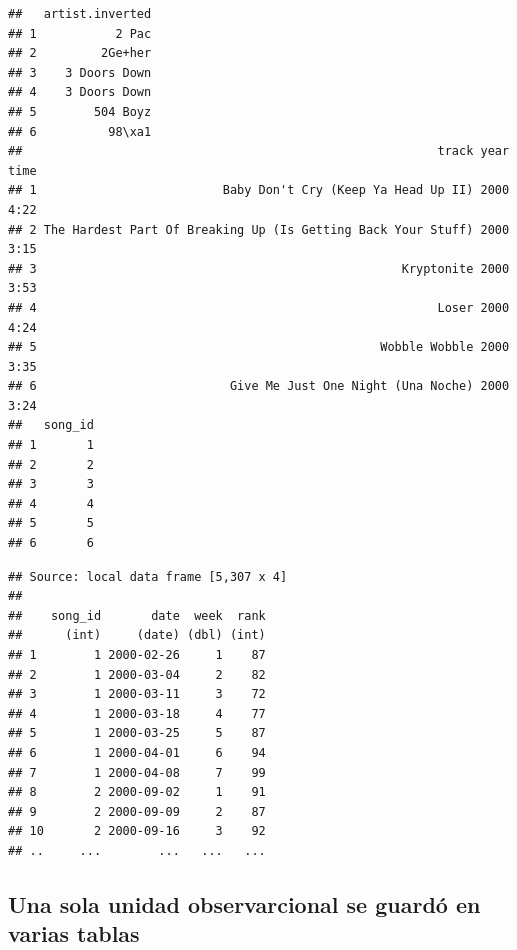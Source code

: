 \documentclass[]{article}
\newenvironment{Shaded}{\begin{snugshade}}{\end{snugshade}}
\newcommand{\KeywordTok}[1]{\textcolor[rgb]{0.13,0.29,0.53}{\textbf{{#1}}}}
\newcommand{\StringTok}[1]{\textcolor[rgb]{0.31,0.60,0.02}{{#1}}}
\newcommand{\NormalTok}[1]{{#1}}
\begin{document}
\begin{verbatim}
##   artist.inverted
## 1           2 Pac
## 2         2Ge+her
## 3    3 Doors Down
## 4    3 Doors Down
## 5        504 Boyz
## 6          98\xa1
##                                                          track year time
## 1                          Baby Don't Cry (Keep Ya Head Up II) 2000 4:22
## 2 The Hardest Part Of Breaking Up (Is Getting Back Your Stuff) 2000 3:15
## 3                                                   Kryptonite 2000 3:53
## 4                                                        Loser 2000 4:24
## 5                                                Wobble Wobble 2000 3:35
## 6                           Give Me Just One Night (Una Noche) 2000 3:24
##   song_id
## 1       1
## 2       2
## 3       3
## 4       4
## 5       5
## 6       6
\end{verbatim}

\begin{Shaded}
\end{Shaded}

\begin{verbatim}
## Source: local data frame [5,307 x 4]
## 
##    song_id       date  week  rank
##      (int)     (date) (dbl) (int)
## 1        1 2000-02-26     1    87
## 2        1 2000-03-04     2    82
## 3        1 2000-03-11     3    72
## 4        1 2000-03-18     4    77
## 5        1 2000-03-25     5    87
## 6        1 2000-04-01     6    94
## 7        1 2000-04-08     7    99
## 8        2 2000-09-02     1    91
## 9        2 2000-09-09     2    87
## 10       2 2000-09-16     3    92
## ..     ...        ...   ...   ...
\end{verbatim}

\subsection{Una sola unidad observarcional se guardó en varias
tablas}\label{una-sola-unidad-observarcional-se-guardo-en-varias-tablas}
\end{document}
